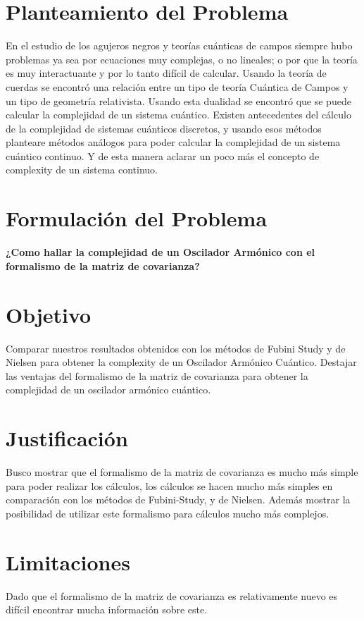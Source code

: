 \documentclass[../Main.tex]{subfiles}
\begin{document}
\section{Planteamiento del Problema}
En el estudio de los agujeros negros y teorías cuánticas de campos siempre hubo problemas ya sea por ecuaciones muy complejas, o no lineales; o por que la teoría es muy interactuante y por lo tanto difícil de calcular. Usando la teoría de cuerdas se encontró una relación entre un tipo de teoría Cuántica de Campos y un tipo de geometría relativista. Usando esta dualidad se encontró que se puede calcular la complejidad de un sistema cuántico. Existen antecedentes del cálculo de la complejidad de sistemas cuánticos discretos, y usando esos métodos planteare métodos análogos para poder calcular la complejidad de un sistema cuántico continuo. Y de esta manera aclarar un poco más el concepto de complexity de un sistema continuo.

\section{Formulación del Problema}
\textbf{¿Como hallar la complejidad de un Oscilador Armónico con el formalismo de la matriz de covarianza?}

\section{Objetivo}
Comparar nuestros resultados obtenidos con los métodos de Fubini Study y de Nielsen para obtener la complexity de un Oscilador Armónico Cuántico. Destajar las ventajas del formalismo de la matriz de covarianza para obtener la complejidad de un oscilador armónico cuántico.

\section{Justificación}
Busco mostrar que el formalismo de la matriz de covarianza es mucho más simple para poder realizar los cálculos, los cálculos se hacen mucho más simples en comparación con los métodos de Fubini-Study, y de Nielsen. Además mostrar la posibilidad de utilizar este formalismo para cálculos mucho más complejos.

\section{Limitaciones}
Dado que el formalismo de la matriz de covarianza es relativamente nuevo es difícil encontrar mucha información sobre este.
\end{document}
